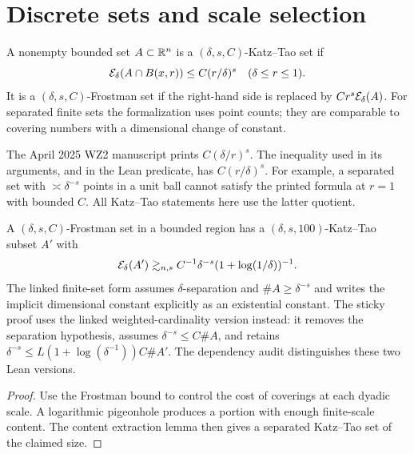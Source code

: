 \section{Discrete sets and scale selection}

\begin{definition}
\label{def:kt-frostman}
\leanok
A nonempty bounded set $A\subset\mathbb{R}^n$ is a
$(\delta,s,C)$-Katz--Tao set if
\[
       \mathcal{E}_\delta(A\cap B(x,r))\leq C(r/\delta)^s
       \quad(\delta\leq r\leq1).
\]
It is a $(\delta,s,C)$-Frostman set if the right-hand side is replaced
by $Cr^s\mathcal{E}_\delta(A)$. For separated finite sets the formalization
uses point counts; they are comparable to covering numbers with a
dimensional change of constant.
\end{definition}

\begin{remark}
\label{rem:kt-quotient}
The April 2025 WZ2 manuscript prints $C(\delta/r)^s$. The inequality
used in its arguments, and in the Lean predicate, has $C(r/\delta)^s$.
For example, a separated set with $\asymp\delta^{-s}$ points in a
unit ball cannot satisfy the printed formula at $r=1$ with bounded
$C$. All Katz--Tao statements here use the latter quotient.
\end{remark}

\begin{lemma}
\label{lem:frostman-to-kt}
A $(\delta,s,C)$-Frostman set in a bounded region has a
$(\delta,s,100)$-Katz--Tao subset $A'$ with
\[
                \mathcal{E}_\delta(A')\gtrsim_{n,s}
                   C^{-1}\delta^{-s}(1+\log(1/\delta))^{-1}.
\]
The linked finite-set form assumes $\delta$-separation and
$\#A\geq\delta^{-s}$ and writes the implicit dimensional constant
explicitly as an existential constant.
The sticky proof uses the linked weighted-cardinality version instead:
it removes the separation hypothesis, assumes
$\delta^{-s}\leq C\#A$, and retains
$\delta^{-s}\leq L(1+\log(\delta^{-1}))C\#A'$.
The dependency audit distinguishes these two Lean versions.
\end{lemma}
\begin{proof}
Use the Frostman bound to control the cost of coverings at each
dyadic scale. A logarithmic pigeonhole produces a portion with
enough finite-scale content. The content extraction lemma then
gives a separated Katz--Tao set of the claimed size.
\end{proof}

